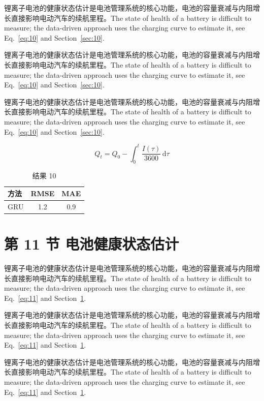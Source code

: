 \documentclass[UTF8,fontset=mac]{ctexart}
\begin{document}
锂离子电池的健康状态估计是电池管理系统的核心功能，电池的容量衰减与内阻增长直接影响电动汽车的续航里程\cite{a2020}。The state of health of a battery is difficult to measure; the data-driven approach uses the charging curve to estimate it, see Eq.~\eqref{eq:10} and Section~\ref{sec:10}.

锂离子电池的健康状态估计是电池管理系统的核心功能，电池的容量衰减与内阻增长直接影响电动汽车的续航里程\cite{a2020}。The state of health of a battery is difficult to measure; the data-driven approach uses the charging curve to estimate it, see Eq.~\eqref{eq:10} and Section~\ref{sec:10}.

锂离子电池的健康状态估计是电池管理系统的核心功能，电池的容量衰减与内阻增长直接影响电动汽车的续航里程\cite{a2020}。The state of health of a battery is difficult to measure; the data-driven approach uses the charging curve to estimate it, see Eq.~\eqref{eq:10} and Section~\ref{sec:10}.

\begin{equation}\label{eq:10}
  Q_t = Q_0 - \int_0^t \frac{I(\tau)}{3600}\,\mathrm{d}\tau
\end{equation}
\begin{table}[h]\centering\begin{tabular}{lcc}\toprule 方法 & RMSE & MAE\\\midrule GRU & 1.2 & 0.9\\\bottomrule\end{tabular}\caption{结果 10}\end{table}

\section{第 11 节 电池健康状态估计}\label{sec:11}
锂离子电池的健康状态估计是电池管理系统的核心功能，电池的容量衰减与内阻增长直接影响电动汽车的续航里程\cite{a2020}。The state of health of a battery is difficult to measure; the data-driven approach uses the charging curve to estimate it, see Eq.~\eqref{eq:11} and Section~\ref{sec:11}.

锂离子电池的健康状态估计是电池管理系统的核心功能，电池的容量衰减与内阻增长直接影响电动汽车的续航里程\cite{a2020}。The state of health of a battery is difficult to measure; the data-driven approach uses the charging curve to estimate it, see Eq.~\eqref{eq:11} and Section~\ref{sec:11}.

锂离子电池的健康状态估计是电池管理系统的核心功能，电池的容量衰减与内阻增长直接影响电动汽车的续航里程\cite{a2020}。The state of health of a battery is difficult to measure; the data-driven approach uses the charging curve to estimate it, see Eq.~\eqref{eq:11} and Section~\ref{sec:11}.
\end{document}

